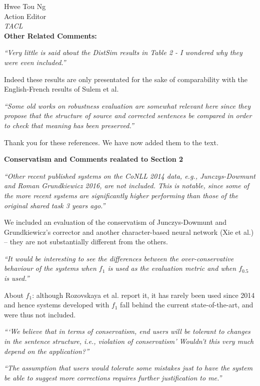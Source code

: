 \documentclass[11pt,letterpaper]{letter}
\begin{document}
\begin{letter}{%
Hwee Tou Ng\\
Action Editor\\
{\em TACL}\\
}
\vspace{.5cm}
{\large\bf Other Related Comments:}
	
\emph{``Very little is said about the DistSim results in Table 2 - I wondered why
	they were even included.''}
	
Indeed these results are only presentated for the sake of comparability with the English-French results of Sulem et al.
	
\emph{``Some old works on robustness evaluation are somewhat relevant here since
	they propose that the structure of source and corrected sentences be
	compared in order to check that meaning has been preserved.''}
	
Thank you for these references. We have now added them to the text.
	
{\large\bf Conservatism and Comments realated to Section 2}

\emph{``Other recent published systems on the CoNLL 2014 data, e.g., Junczys-Dowmunt
	and Roman Grundkiewicz 2016, are not included. This is notable, since some
	of the more recent systems are significantly higher performing than those of
	the original shared task 3 years ago.''}
	
We included an evaluation of the conservatism of Junczys-Dowmunt and Grundkiewicz's corrector  and another character-based neural network (Xie et al.) -- they are not substantially different from the others.

\emph{``It would be interesting to see the differences between the over-conservative
	behaviour of the systems when $f_1$ is used as the evaluation metric and when
	$f_{0.5}$ is used.''}

About $f_1$: although Rozovskaya et al. report it, it has rarely been used since 2014 and hence systems developed with $f_1$ fall behind the current state-of-the-art, and were thus not included.
	
\emph{```We believe that in terms of conservatism, end users will be tolerant to
	changes in the sentence structure, i.e., violation of conservatism' Wouldn't
	this very much depend on the application?''
}

\emph{``The assumption that users would tolerate
	some mistakes just to have the system be able to suggest more corrections
	requires further justification to me.''
}
	

\end{letter}
\end{document}
